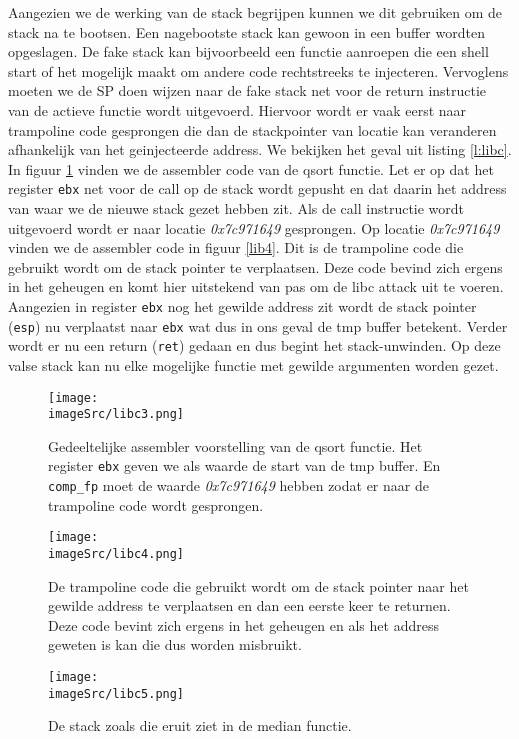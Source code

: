 \documentclass[../main.tex]{subfiles}
\begin{document}
Aangezien we de werking van de stack begrijpen kunnen we dit gebruiken om de stack na te bootsen.
Een nagebootste stack kan gewoon in een buffer wordten opgeslagen.
De fake stack kan bijvoorbeeld een functie aanroepen die een shell start of het mogelijk maakt om andere code rechtstreeks te injecteren.
Vervoglens moeten we de SP doen wijzen naar de fake stack net voor de return instructie van de actieve functie wordt uitgevoerd.
Hiervoor wordt er vaak eerst naar trampoline code gesprongen die dan de stackpointer van locatie kan veranderen afhankelijk van het geinjecteerde address.
We bekijken het geval uit listing \ref{l:libc}. 
In figuur \ref{f:libc3} vinden we de assembler code van de qsort functie.
Let er op dat het register \texttt{ebx} net voor de call op de stack wordt gepusht en dat daarin het address van waar we de nieuwe stack gezet hebben zit.
Als de call instructie wordt uitgevoerd wordt er naar locatie \textit{0x7c971649} gesprongen. 
Op locatie \textit{0x7c971649} vinden we de assembler code in figuur \ref{lib4}.
Dit is de trampoline code die gebruikt wordt om de stack pointer te verplaatsen.
Deze code bevind zich ergens in het geheugen en komt hier uitstekend van pas om de libc attack uit te voeren. 
Aangezien in register \texttt{ebx} nog het gewilde address zit wordt de stack pointer (\texttt{esp}) nu verplaatst naar \texttt{ebx} wat dus in ons geval de tmp buffer betekent.
Verder wordt er nu een return (\texttt{ret}) gedaan en dus begint het stack-unwinden.
Op deze valse stack kan nu elke mogelijke functie met gewilde argumenten worden gezet.
\begin{figure}
\centering
\texttt{[image: \\imageSrc/libc3.png]}
\caption{Gedeeltelijke assembler voorstelling van de qsort functie. Het register \texttt{ebx} geven we als waarde de start van de tmp buffer. En \texttt{comp\_fp} moet de waarde \textit{0x7c971649} hebben zodat er naar de trampoline code wordt gesprongen.}
\label{f:libc3}
\end{figure}

\begin{figure}
\centering
\texttt{[image: \\imageSrc/libc4.png]}
\caption{De trampoline code die gebruikt wordt om de stack pointer naar het gewilde address te verplaatsen en dan een eerste keer te returnen. Deze code bevint zich ergens in het geheugen en als het address geweten is kan die dus worden misbruikt.}
\label{f:libc4}
\end{figure}

\begin{figure}
\centering
\texttt{[image: \\imageSrc/libc5.png]}
\caption{De stack zoals die eruit ziet in de median functie.}
\label{f:libc5}
\end{figure}
\end{document}
